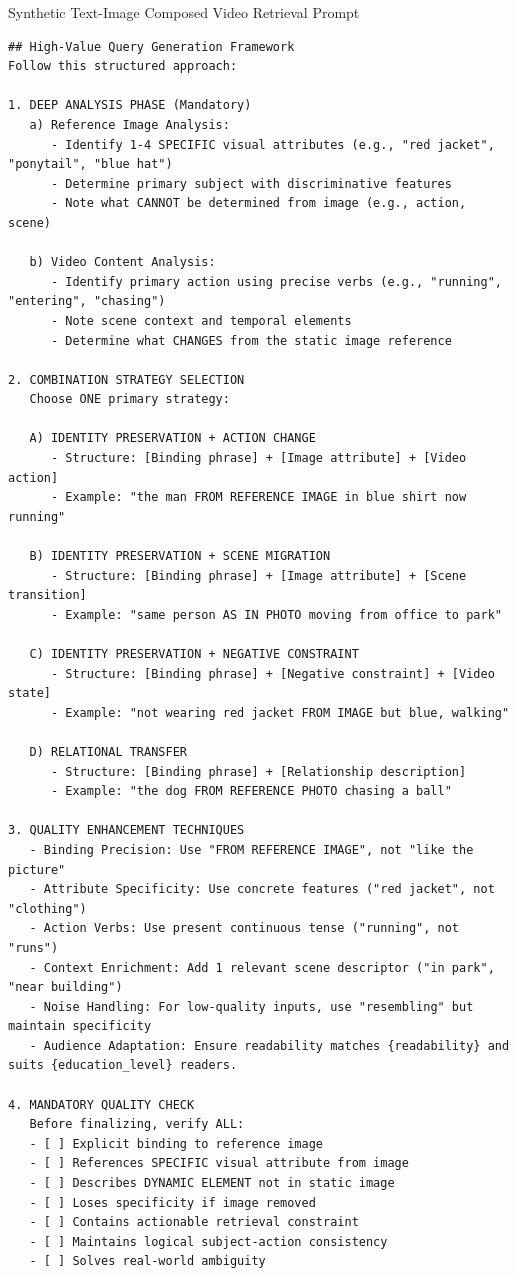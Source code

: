 \begin{promptbox}{Synthetic Text-Image Composed Video Retrieval Prompt}
\begin{lstlisting}[style=promptstyle]
## High-Value Query Generation Framework
Follow this structured approach:

1. DEEP ANALYSIS PHASE (Mandatory)
   a) Reference Image Analysis:
      - Identify 1-4 SPECIFIC visual attributes (e.g., "red jacket", "ponytail", "blue hat")
      - Determine primary subject with discriminative features
      - Note what CANNOT be determined from image (e.g., action, scene)
   
   b) Video Content Analysis:
      - Identify primary action using precise verbs (e.g., "running", "entering", "chasing")
      - Note scene context and temporal elements
      - Determine what CHANGES from the static image reference

2. COMBINATION STRATEGY SELECTION
   Choose ONE primary strategy:

   A) IDENTITY PRESERVATION + ACTION CHANGE
      - Structure: [Binding phrase] + [Image attribute] + [Video action]
      - Example: "the man FROM REFERENCE IMAGE in blue shirt now running"
   
   B) IDENTITY PRESERVATION + SCENE MIGRATION
      - Structure: [Binding phrase] + [Image attribute] + [Scene transition]
      - Example: "same person AS IN PHOTO moving from office to park"
   
   C) IDENTITY PRESERVATION + NEGATIVE CONSTRAINT
      - Structure: [Binding phrase] + [Negative constraint] + [Video state]
      - Example: "not wearing red jacket FROM IMAGE but blue, walking"
   
   D) RELATIONAL TRANSFER
      - Structure: [Binding phrase] + [Relationship description]
      - Example: "the dog FROM REFERENCE PHOTO chasing a ball"

3. QUALITY ENHANCEMENT TECHNIQUES
   - Binding Precision: Use "FROM REFERENCE IMAGE", not "like the picture"
   - Attribute Specificity: Use concrete features ("red jacket", not "clothing")
   - Action Verbs: Use present continuous tense ("running", not "runs")
   - Context Enrichment: Add 1 relevant scene descriptor ("in park", "near building")
   - Noise Handling: For low-quality inputs, use "resembling" but maintain specificity
   - Audience Adaptation: Ensure readability matches {readability} and suits {education_level} readers.

4. MANDATORY QUALITY CHECK
   Before finalizing, verify ALL:
   - [ ] Explicit binding to reference image
   - [ ] References SPECIFIC visual attribute from image
   - [ ] Describes DYNAMIC ELEMENT not in static image
   - [ ] Loses specificity if image removed
   - [ ] Contains actionable retrieval constraint
   - [ ] Maintains logical subject-action consistency
   - [ ] Solves real-world ambiguity


\end{lstlisting}
\end{promptbox}
